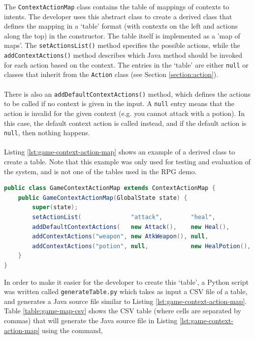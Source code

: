 \documentclass[11pt]{article}
\begin{document}
The \texttt{ContextActionMap} class contains the table of mappings of contexts to intents. The developer uses this abstract class to create a derived class that defines the mapping in a `table' format (with contexts on the left and actions along the top) in the constructor. The table itself is implemented as a 'map of maps'. The \texttt{setActionsList()} method specifies the possible actions, while the \texttt{addContextActions()} method describes which Java method should be invoked for each action based on the context. The entries in the `table' are either \texttt{null} or classes that inherit from the \texttt{Action} class (see Section \ref{section:action}).
\\
\\
There is also an \texttt{addDefaultContextActions()} method, which defines the actions to be called if no context is given in the input. A \texttt{null} entry means that the action is invalid for the given context (e.g. you cannot attack with a potion). In this case, the default context action is called instead, and if the default action is \texttt{null}, then nothing happens.
\\
\\
Listing \ref{lst:game-context-action-map} shows an example of a derived class to create a table. Note that this example was only used for testing and evaluation of the system, and is not one of the tables used in the RPG demo.

\begin{lstlisting}[language=Java, caption=Example of a ContextActionMap, label={lst:game-context-action-map}]
public class GameContextActionMap extends ContextActionMap {
    public GameContextActionMap(GlobalState state) {
        super(state);
        setActionList(              "attack",        "heal",           "move");
        addDefaultContextActions(   new Attack(),    new Heal(),       new Move());
        addContextActions("weapon", new AtkWeapon(), null,             null);
        addContextActions("potion", null,            new HealPotion(), null);
    }
}
\end{lstlisting}

In order to make it easier for the developer to create this `table', a Python script was written called \texttt{generateTable.py} which takes as input a CSV file of a table, and generates a Java source file similar to Listing \ref{lst:game-context-action-map}. Table \ref{table:game-map-csv} shows the CSV table (where cells are separated by commas) that will generate the Java source file in Listing \ref{lst:game-context-action-map} using the command, 
\end{document}
